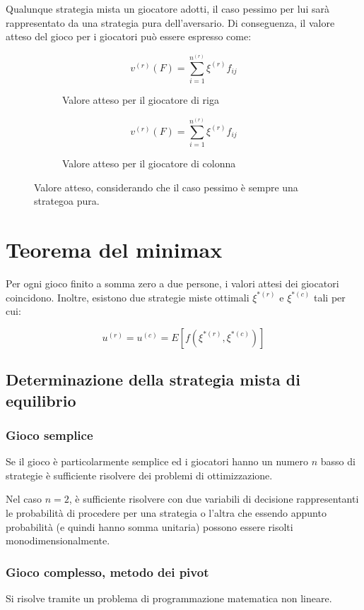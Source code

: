 \documentclass[\main/main.tex]{subfiles}
\begin{document}
\begin{theorem}
  Qualunque strategia mista un giocatore adotti, il caso pessimo per lui sarà rappresentato da una strategia pura dell'aversario. Di conseguenza, il valore atteso del gioco per i giocatori può essere espresso come:
  \begin{figure}
    \begin{subfigure}{0.49\textwidth}
      \[
        v^{(r)}(F) = \sum_{i=1}^{n^{(r)}} \xi^{(r)} f_{ij}
      \]
      \caption{Valore atteso per il giocatore di riga}
    \end{subfigure}
    \begin{subfigure}{0.49\textwidth}
      \[
        v^{(r)}(F) = \sum_{i=1}^{n^{(r)}} \xi^{(r)} f_{ij}
      \]
      \caption{Valore atteso per il giocatore di colonna}
    \end{subfigure}
    \caption{Valore atteso, considerando che il caso pessimo è sempre una strategoa pura.}
  \end{figure}
\end{theorem}

\section{Teorema del minimax}
\begin{theorem}
  Per ogni gioco finito a somma zero a due persone, i valori attesi dei giocatori coincidono. Inoltre, esistono due strategie miste ottimali $\xi^{*(r)}$ e $\xi^{*(c)}$ tali per cui:

  \[
    u^{(r)} = u^{(c)} = E\left[ f(\xi^{*(r)}, \xi^{*(c)}) \right]
  \]
\end{theorem}

\subsection{Determinazione della strategia mista di equilibrio}
\subsubsection{Gioco semplice}
Se il gioco è particolarmente semplice ed i giocatori hanno un numero $n$ basso di strategie è sufficiente risolvere dei problemi di ottimizzazione.

Nel caso $n=2$, è sufficiente risolvere con due variabili di decisione rappresentanti le probabilità di procedere per una strategia o l'altra che essendo appunto probabilità (e quindi hanno somma unitaria) possono essere risolti monodimensionalmente.

\subsubsection{Gioco complesso, metodo dei pivot}
Si risolve tramite un problema di programmazione matematica non lineare.
\end{document}
